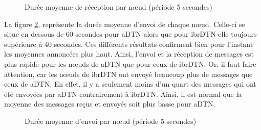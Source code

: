 \documentclass[a4paper,10pt]{article}
\begin{document}
\begin{figure}[h!]
    \centering
    \caption{Durée moyenne de réception par nœud (période 5 secondes)}
    \label{fig:05_avg_rcv_duration}
\end{figure}

La figure \ref{fig:05_avg_snd_duration}, représente la durée moyenne d’envoi de chaque nœud. Celle-ci se situe en dessous de 60 secondes pour aDTN alors que pour ibrDTN elle toujours supérieure à 40 secondes. Ces différents résultats confirment bien pour l’instant les moyennes annoncées plus haut. Ainsi, l’envoi et la réception de messages est plus rapide pour les nœuds de aDTN que pour ceux de ibrDTN. Or, il faut faire attention, car les nœuds de ibrDTN ont envoyé beaucoup plus de messages que ceux de aDTN. En effet, il y a seulement moins d’un quart des messages qui ont été envoyées par aDTN contrairement à ibrDTN. Ainsi, il est normal que la moyenne des messages reçus et envoyés soit plus basse pour aDTN.\par

\begin{figure}[h!]
    \centering
    \caption{Durée moyenne d'envoi par nœud (période 5 secondes)}
    \label{fig:05_avg_snd_duration}
\end{figure}
\end{document}
